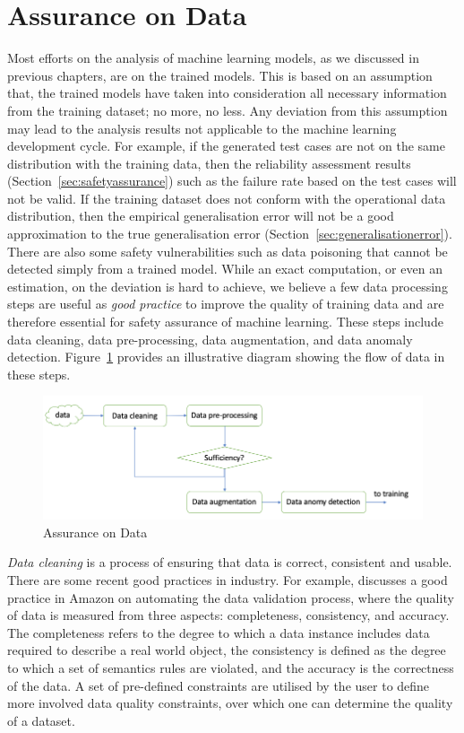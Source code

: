 \section{Assurance on Data}\label{sec:datapreparation}

Most efforts on the analysis of machine learning models, as we discussed in previous chapters, are on the trained models. This is based on an assumption that, the trained models have taken into consideration all necessary information from the training dataset; no more, no less. Any deviation from this assumption may lead to the analysis results not applicable to the machine learning development cycle. For example, if the generated test cases are not on the same distribution with the training data, then the reliability assessment results (Section~\ref{sec:safetyassurance}) such as the failure rate based on the test cases will not be valid. If the training dataset does not conform with the operational data distribution, then the empirical generalisation error will not be a good approximation to the true generalisation error (Section~\ref{sec:generalisationerror}). There are also some safety vulnerabilities such as data poisoning that cannot be detected simply from a trained model. While an exact computation, or even an  estimation, on the deviation is hard to achieve, we believe a few  data processing steps are useful as \emph{good practice} to improve the quality of training data and are therefore essential for safety assurance of machine learning. These steps include data cleaning, data pre-processing, data augmentation, and data anomaly detection. Figure~\ref{fig:dataquality} provides an illustrative diagram showing the flow of data in these steps. 

\begin{figure}[!htbp]
    \centering
    \includegraphics[width=\textwidth]{images/LookFurther/dataquality.png}
    \caption{Assurance on Data}
    \label{fig:dataquality}
\end{figure}

%
\emph{Data cleaning} is a process of ensuring that data is correct, consistent and usable. There are some recent good practices in industry. For example, \cite{10.14778/3229863.3229867} discusses a good practice in Amazon on automating the data validation process, where the quality of data is measured from three aspects: completeness, consistency, and accuracy. The completeness refers to the degree to which a data instance includes data required to describe a real world object, the consistency is defined as the degree to which a set of semantics rules are violated, and the accuracy is the correctness of the data. A set of pre-defined constraints are utilised by the user to define more involved data quality constraints, over which one can determine the quality of a dataset. 

